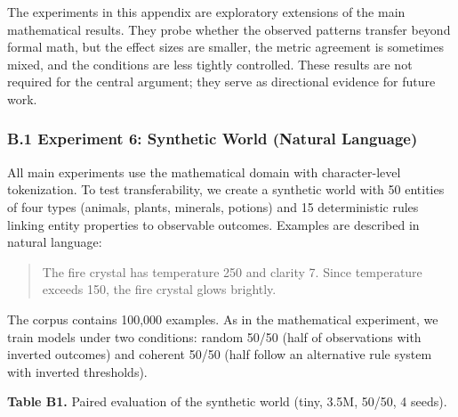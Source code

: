 \documentclass[
  11pt,
]{article}
\begin{document}
The experiments in this appendix are exploratory extensions of the main
mathematical results. They probe whether the observed patterns transfer
beyond formal math, but the effect sizes are smaller, the metric
agreement is sometimes mixed, and the conditions are less tightly
controlled. These results are not required for the central argument;
they serve as directional evidence for future work.

\subsubsection{B.1 Experiment 6: Synthetic World (Natural
Language)}\label{b.1-experiment-6-synthetic-world-natural-language}

All main experiments use the mathematical domain with character-level
tokenization. To test transferability, we create a synthetic world with
50 entities of four types (animals, plants, minerals, potions) and 15
deterministic rules linking entity properties to observable outcomes.
Examples are described in natural language:

\begin{quote}
The fire crystal has temperature 250 and clarity 7. Since temperature
exceeds 150, the fire crystal glows brightly.
\end{quote}

The corpus contains 100,000 examples. As in the mathematical experiment,
we train models under two conditions: random 50/50 (half of observations
with inverted outcomes) and coherent 50/50 (half follow an alternative
rule system with inverted thresholds).

\textbf{Table B1.} Paired evaluation of the synthetic world (tiny, 3.5M,
50/50, 4 seeds).
\end{document}
